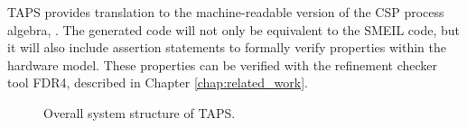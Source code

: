 TAPS provides translation to the machine-readable version of the CSP process algebra, \cspm{}. The generated \cspm{} code will not only be equivalent to the SMEIL code, but it will also include assertion statements to formally verify properties within the hardware model. These properties can be verified with the \cspm{} refinement checker tool FDR4, described in Chapter \ref{chap:related_work}.
\begin{figure}[!ht]
  \centering
  \caption{Overall system structure of TAPS.}
  \label{fig:simple_TAPS_network}
\end{figure}


